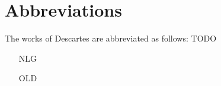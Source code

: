 \chapter{Abbreviations}

The works of Descartes are abbreviated as follows: TODO

\begin{itemize}
    \item[NLG] 
    \item[OLD] 
\end{itemize}
